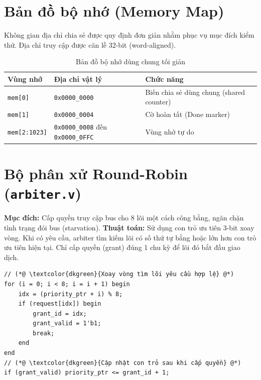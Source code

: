 \section{Bản đồ bộ nhớ (Memory Map)}
Không gian địa chỉ chia sẻ được quy định đơn giản nhằm phục vụ mục đích kiểm thử. Địa chỉ truy cập được căn lề 32-bit (word-aligned).
\begin{table}[H]
\centering
\begin{tabular}{|l|l|p{6cm}|}
\hline
\textbf{Vùng nhớ} & \textbf{Địa chỉ vật lý} & \textbf{Chức năng} \\
\hline
\texttt{mem[0]} & \texttt{0x0000\_0000} & Biến chia sẻ dùng chung (shared counter) \\
\hline
\texttt{mem[1]} & \texttt{0x0000\_0004} & Cờ hoàn tất (Done marker) \\
\hline
\texttt{mem[2:1023]} & \texttt{0x0000\_0008} đến \texttt{0x0000\_0FFC} & Vùng nhớ tự do \\
\hline
\end{tabular}
\caption{Bản đồ bộ nhớ dùng chung tối giản}
\label{tab:memory_map}
\end{table}

\section{Bộ phân xử Round-Robin (\texttt{arbiter.v})}
\textbf{Mục đích:} Cấp quyền truy cập bus cho 8 lõi một cách công bằng, ngăn chặn tình trạng đói bus (starvation).
\textbf{Thuật toán:} Sử dụng con trỏ ưu tiên 3-bit xoay vòng. Khi có yêu cầu, arbiter tìm kiếm lõi có số thứ tự bằng hoặc lớn hơn con trỏ ưu tiên hiện tại. Chỉ cấp quyền (grant) đúng 1 chu kỳ để lõi đó bắt đầu giao dịch.

\begin{lstlisting}[caption={Thuật toán Round-Robin trong Arbiter},label={lst:arbiter}]
// (*@ \textcolor{dkgreen}{Xoay vòng tìm lõi yêu cầu hợp lệ} @*)
for (i = 0; i < 8; i = i + 1) begin
    idx = (priority_ptr + i) % 8;
    if (request[idx]) begin
        grant_id = idx;
        grant_valid = 1'b1;
        break;
    end
end
// (*@ \textcolor{dkgreen}{Cập nhật con trỏ sau khi cấp quyền} @*)
if (grant_valid) priority_ptr <= grant_id + 1;
\end{lstlisting}

